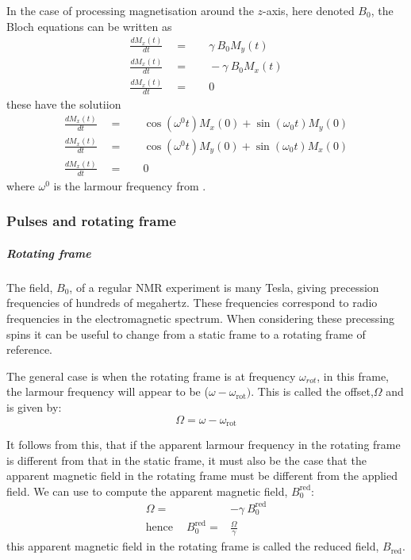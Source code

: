 In the case of processing magnetisation around the $z$-axis, here denoted $B_0$, the
Bloch equations can be written as
\begin{align}
  \frac{dM_x(t)}{dt}\quad=&\quad\gamma~B_0M_y(t)\\
  \frac{dM_x(t)}{dt}\quad=&\quad-\gamma~B_0M_x(t)\\
  \frac{dM_x(t)}{dt}\quad=&\quad0
\end{align}
these have the solutiion
\begin{align}
  \frac{dM_x(t)}{dt}\quad=&\quad\cos(\omega^0t)M_x(0) + \sin(\omega_0t)M_y(0)\\
  \frac{dM_x(t)}{dt}\quad=&\quad\cos(\omega^0t)M_y(0) + \sin(\omega_0t)M_x(0)\\
  \frac{dM_x(t)}{dt}\quad=&\quad0
\end{align}
where $\omega^0$ is the larmour frequency from .

\subsubsection{Pulses and rotating frame}

\subparagraph{Rotating frame}

The field, $B_0$, of a regular NMR experiment is many Tesla, giving precession
frequencies of hundreds of megahertz. These frequencies correspond to radio frequencies in the electromagnetic spectrum. When considering these precessing spins
it can be useful to change from a static frame to a rotating frame of reference.

The general case is when the rotating frame is at frequency $\omega_{rot}$, in this
frame, the larmour frequency will appear to be ($\omega - \omega_{\text{rot}})$. This is called the offset,$\Omega$ and is given by:
\begin{equation}
  \Omega = \omega -\omega_{\text{rot}}
\end{equation}

It follows from this, that if the apparent larmour frequency in the rotating frame is different from that in the static frame, it must also be the case that the apparent magnetic field in the rotating frame must be different from the applied
field. We can use  to compute the apparent magnetic field, $B^{\text{red}}_0$:
\begin{align}\label{eqn:redB}
  \Omega =& -\gamma~B^{\text{red}}_0\\
\text{hence}\quad~B^{\text{red}}_0 =& \frac{\Omega}{\gamma}
\end{align}
this apparent magnetic field in the rotating frame is called the reduced field, $B_{\text{red}}$.

